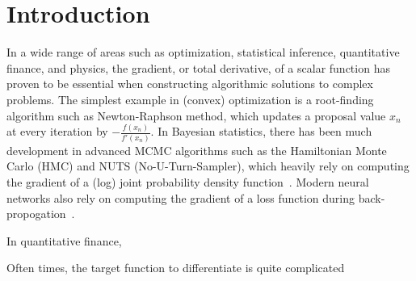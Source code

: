 \section{Introduction}

In a wide range of areas such as
optimization, statistical inference, quantitative finance, and physics,
the gradient, or total derivative, of a scalar function 
has proven to be essential when constructing algorithmic solutions to complex problems.
The simplest example in (convex) optimization is a root-finding algorithm such as Newton-Raphson method,
which updates a proposal value $x_n$ at every iteration by $-\frac{f(x_n)}{f'(x_n)}$.
In Bayesian statistics, there has been much development in advanced MCMC algorithms
such as the Hamiltonian Monte Carlo (HMC) and NUTS (No-U-Turn-Sampler),
which heavily rely on computing the gradient of 
a (log) joint probability density function~\cite{hoffman:2011}\cite{neal:2012}.
Modern neural networks also rely on computing 
the gradient of a loss function during back-propogation~\cite{goodfellow:2016}.


In quantitative finance, 

Often times, the target function to differentiate is quite complicated
